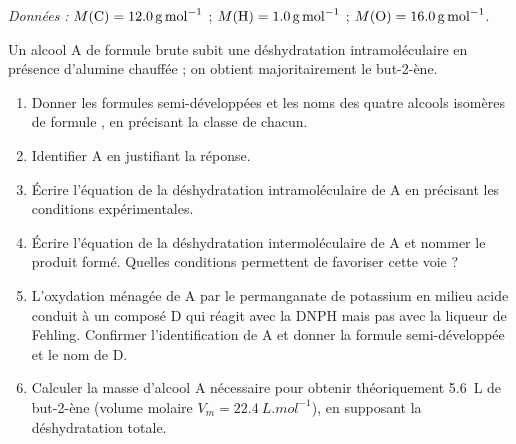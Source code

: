 \documentclass[11pt]{article}
\begin{document}
\begin{exercice}
\emph{Données :} $M(\ce{C}) = \SI{12,0}{g.mol^{-1}}$ ; $M(\ce{H}) = \SI{1,0}{g.mol^{-1}}$ ; $M(\ce{O}) = \SI{16,0}{g.mol^{-1}}$.

Un alcool A de formule brute  subit une déshydratation intramoléculaire en présence d'alumine chauffée ; on obtient majoritairement le but-2-ène.
\begin{enumerate}
  \item Donner les formules semi-développées et les noms des quatre alcools isomères de formule , en précisant la classe de chacun.
  \item Identifier A en justifiant la réponse.
  \item Écrire l'équation de la déshydratation intramoléculaire de A en précisant les conditions expérimentales.
  \item Écrire l'équation de la déshydratation intermoléculaire de A et nommer le produit formé. Quelles conditions permettent de favoriser cette voie ?
  \item L'oxydation ménagée de A par le permanganate de potassium en milieu acide conduit à un composé D qui réagit avec la DNPH mais pas avec la liqueur de Fehling. Confirmer l'identification de A et donner la formule semi-développée et le nom de D.
  \item Calculer la masse d'alcool A nécessaire pour obtenir théoriquement \SI{5,6}{L} de but-2-ène (volume molaire $V_m = \SI{22,4}{L.mol^{-1}}$), en supposant la déshydratation totale.
\end{enumerate}
\end{exercice}
\end{document}
